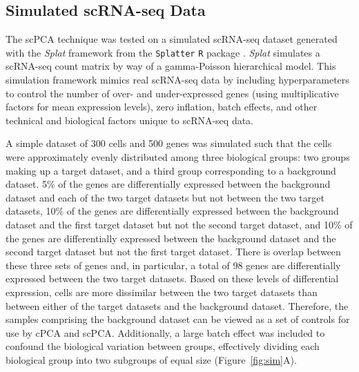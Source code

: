 
\subsection{Simulated scRNA-seq Data}\label{sim_scRNA-seq}

The scPCA technique was tested on a simulated scRNA-seq dataset generated with the \textit{Splat} framework from the \texttt{Splatter} \texttt{R} package  \citep{Zappia2017}. \textit{Splat} simulates a scRNA-seq count matrix by way of a gamma-Poisson hierarchical model. This simulation framework mimics real scRNA-seq data by including hyperparameters to control the number of over- and under-expressed genes (using multiplicative factors for mean expression levels), zero inflation, batch effects, and other technical and biological factors unique to scRNA-seq data.

A simple dataset of 300 cells and 500 genes was simulated such that the cells were approximately evenly distributed among three biological groups: two groups making up a target dataset, and a third group corresponding to a background dataset. 5\% of the genes are differentially expressed between the background dataset and each of the two target datasets but not between the two target datasets, 10\% of the genes are differentially expressed between the background dataset and the first target dataset but not the second target dataset, and 10\% of the genes are differentially expressed between the background dataset and the second target dataset but not the first target dataset. There is overlap between these three sets of genes and, in particular, a total of 98 genes are differentially expressed between the two target datasets. Based on these levels of differential expression, cells are more dissimilar between the two target datasets than between either of the target datasets and the background dataset. Therefore, the samples comprising the background dataset can be viewed as a set of controls for use by cPCA and scPCA. Additionally, a large batch effect was included to confound the biological variation between groups, effectively dividing each biological group into two subgroups of equal size (Figure~\ref{fig:sim}A).

